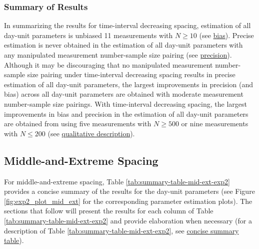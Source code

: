 \documentclass[
12pt, %
twoside,
english]{guelphthesis}
\theoremstyle{definition}
\theoremstyle{definition}
\theoremstyle{definition}
\theoremstyle{definition}
\theoremstyle{remark}
\begin{document}
\hypertarget{summary-of-results-6}{%
\subsubsection{Summary of Results}\label{summary-of-results-6}}

In summarizing the results for time-interval decreasing spacing, estimation of all day-unit parameters is unbiased 11 measurements with \(N \ge 10\) (see \protect\hyperlink{bias-time-dec-exp2}{bias}). Precise estimation is never obtained in the estimation of all day-unit parameters with any manipulated measurement number-sample size pairing (see \protect\hyperlink{precision-time-inc-exp2}{precision}). Although it may be discouraging that no manipulated measurement number-sample size pairing under time-interval decreasing spacing results in precise estimation of all day-unit parameters, the largest improvements in precision (and bias) across all day-unit parameters are obtained with moderate measurement number-sample size pairings. With time-interval decreasing spacing, the largest improvements in bias and precision in the estimation of all day-unit parameters are obtained from using five measurements with \(N \ge 500\) or nine measurements with \(N \le 200\) (see \protect\hyperlink{qualitative-time-inc-exp2}{qualitative description}).

\hypertarget{middle-and-extreme-spacing-1}{%
\subsection{Middle-and-Extreme Spacing}\label{middle-and-extreme-spacing-1}}

For middle-and-extreme spacing, Table \ref{tab:summary-table-mid-ext-exp2} provides a concise summary of the results for the day-unit parameters (see Figure \ref{fig:exp2_plot_mid_ext} for the corresponding parameter estimation plots). The sections that follow will present the results for each column of Table \ref{tab:summary-table-mid-ext-exp2} and provide elaboration when necessary (for a description of Table \ref{tab:summary-table-mid-ext-exp2}, see \protect\hyperlink{concise-example}{concise summary table}).
\end{document}

